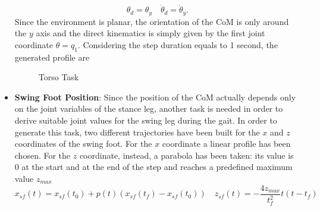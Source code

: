 \documentclass[11pt]{article}
\begin{document}
\begin{itemize}
\begin{equation}
\label{eqn:com_or_task}
\theta_d = \theta_y \quad \dot{\theta}_d = \dot{\theta}_y.
\end{equation}
Since the environment is planar, the orientation of the CoM is only around the $y$ axis and the direct kinematics is simply given by the first joint coordinate $\theta=q_1$. Considering the step duration equals to 1 second, the generated profile are
\begin{figure}[H]
\centering
{}
\caption{Torso Task}
\end{figure}
\item \textbf{Swing Foot Position}: Since the position of the CoM actually depends only on the joint variables of the stance leg, another task is needed in order to derive suitable joint values for the swing leg during the gait. In order to generate this task, two different trajectories have been built for the $x$ and $z$ coordinates of the swing foot. For the $x$ coordinate a linear profile has been chosen. For the $z$ coordinate, instead, a parabola has been taken: its value is $0$ at the start and at the end of the step and reaches a predefined maximum value $z_{max}$
\begin{equation}
\label{eqn:sf_traj}
x_{sf}(t) = x_{sf}(t_0) + p(t)(x_{sf}(t_f)-x_{sf}(t_0)) \quad z_{sf}(t) = -\frac{4z_{max}}{t_f^2}t(t-t_f)
\end{equation}
\begin{equation}

\end{equation}
\end{itemize}
\end{document}
